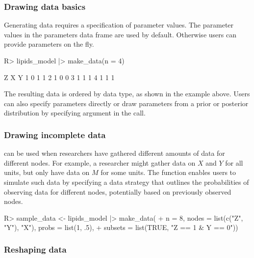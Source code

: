 \documentclass[
  11pt,
  article]{jss}
\renewcommand{\texttt}[1]{\code{#1}}
\begin{document}
\subsubsection{Drawing data basics}\label{drawing-data-basics}

Generating data requires a specification of parameter values. The
parameter values in the parameters data frame are used by default.
Otherwise users can provide parameters on the fly.

\begin{CodeChunk}
\begin{CodeInput}
R> lipids_model |> make_data(n = 4)
\end{CodeInput}

\begin{CodeOutput}
  Z X Y
1 0 1 1
2 1 0 0
3 1 1 1
4 1 1 1
\end{CodeOutput}
\end{CodeChunk}

The resulting data is ordered by data type, as shown in the example
above. Users can also specify parameters directly or draw parameters
from a prior or posterior distribution by specifying
\texttt{param\_type} argument in the \texttt{make\_data()} call.

\subsubsection{Drawing incomplete data}\label{drawing-incomplete-data}

 can be used when researchers have gathered different
amounts of data for different nodes. For example, a researcher might
gather data on \(X\) and \(Y\) for all units, but only have data on
\(M\) for some units. The \texttt{make\_data()} function enables users
to simulate such data by specifying a data strategy that outlines the
probabilities of observing data for different nodes, potentially based
on previously observed nodes.

\begin{CodeInput}
R> sample_data <- lipids_model |> make_data(
+    n = 8, nodes = list(c("Z", "Y"), "X"), probs = list(1, .5),
+    subsets = list(TRUE, "Z == 1 & Y == 0"))
\end{CodeInput}

\subsubsection{Reshaping data}\label{reshaping-data}
\end{document}
